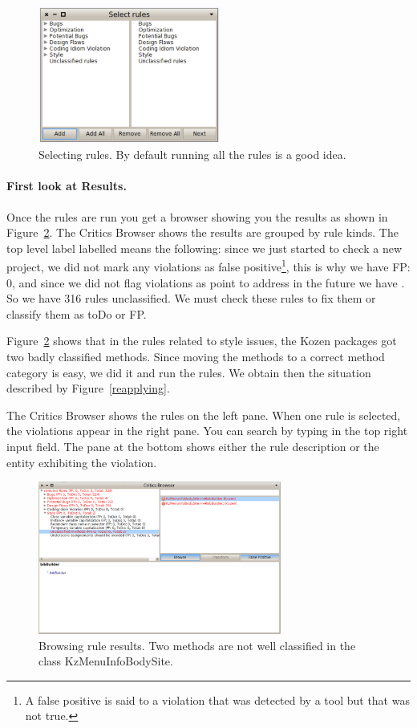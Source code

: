 \documentclass[a4paper,10pt,twoside]{book}
\begin{document}
\begin{figure}[h]
\centering
\includegraphics[width=6cm]{selectingRules}
\caption{Selecting rules. By default running all the rules is a good idea. \label{ruleselection}}

\end{figure}


\paragraph{First look at Results.} Once the rules are run you get a browser showing you the results as shown in Figure~\ref{unclassified}. 
The Critics Browser shows the results are grouped by rule kinds. 
The top level label labelled  means the following: since we just started to check a new project, we did not mark any violations as false positive\footnote{A false positive is said to a violation that was detected by a tool but that was not true.}, this is why we have FP: 0, and since we did not flag violations as point to address in the future we have . So we have 316 rules unclassified. We must check these rules to fix them or classify them as toDo or FP.



Figure~\ref{unclassified} shows that in the rules related to style issues, the Kozen packages got two badly classified methods. Since moving the methods to a correct method category is easy, we did it and run the rules. We obtain then the situation described by Figure~\ref{reapplying}.

The Critics Browser shows the rules on the left pane. When one rule is selected, the violations appear in the right pane. You can search by typing in the top right input field. The pane at the bottom shows either the rule description or the entity exhibiting the violation. 

\begin{figure}[h]
\centering
\includegraphics[width=8cm]{UnclassifiedMethods}
\caption{Browsing rule results. Two methods are not well classified in the class KzMenuInfoBodySite.\label{unclassified}}
\end{figure}
\end{document}
